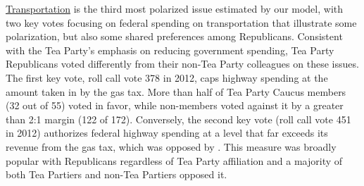 \underline{Transportation} is the third most polarized issue estimated by our model, with two key votes focusing on federal spending on transportation that illustrate some polarization, but also some shared preferences among Republicans. Consistent with the Tea Party's emphasis on reducing government spending, Tea Party Republicans voted differently from their non-Tea Party colleagues on these issues. The first key vote, roll call vote 378 in 2012, caps highway spending at the amount taken in by the gas tax. More than half of Tea Party Caucus members (32 out of 55) voted in favor, while non-members voted against it by a greater than 2:1 margin (122 of 172). Conversely, the second key vote (roll call vote 451 in 2012) authorizes federal highway spending at a level that far exceeds its revenue from the gas tax, which was opposed by \fw{}.  This measure was broadly popular with Republicans regardless of Tea Party affiliation and a majority of both Tea Partiers and non-Tea Partiers opposed it.






























